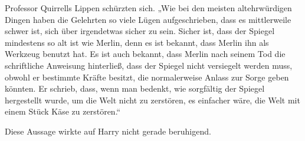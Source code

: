 Professor Quirrells Lippen schürzten sich.
„Wie bei den meisten altehrwürdigen Dingen haben die Gelehrten so viele Lügen aufgeschrieben, dass es mittlerweile schwer ist, sich über irgendetwas sicher zu sein. Sicher ist, dass der Spiegel mindestens so alt ist wie Merlin, denn es ist bekannt, dass Merlin ihn als Werkzeug benutzt hat. Es ist auch bekannt, dass Merlin nach seinem Tod die schriftliche Anweisung hinterließ, dass der Spiegel nicht versiegelt werden muss, obwohl er bestimmte Kräfte besitzt, die normalerweise Anlass zur Sorge geben könnten. Er schrieb, dass, wenn man bedenkt, wie sorgfältig der Spiegel hergestellt wurde, um die Welt nicht zu zerstören, es einfacher wäre, die Welt mit einem Stück Käse zu zerstören.“

Diese Aussage wirkte auf Harry nicht gerade beruhigend.

